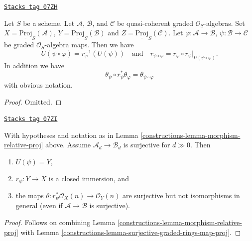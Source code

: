 \begin{lemma}
\label{constructions-lemma-morphism-relative-proj-transitive}
\href{https://stacks.math.columbia.edu/tag/07ZH}{\texttt{Stacks tag 07ZH}}

Let $S$ be a scheme. Let $\mathcal{A}$, $\mathcal{B}$, and $\mathcal{C}$ be
quasi-coherent graded $\mathcal{O}_S$-algebras.
Set $X = \underline{\text{Proj}}_S(\mathcal{A})$,
$Y = \underline{\text{Proj}}_S(\mathcal{B})$ and
$Z = \underline{\text{Proj}}_S(\mathcal{C})$.
Let $\varphi : \mathcal{A} \to \mathcal{B}$,
$\psi : \mathcal{B} \to \mathcal{C}$ be graded $\mathcal{O}_S$-algebra maps.
Then we have
$$
U(\psi \circ \varphi) = r_\varphi^{-1}(U(\psi))
\quad
\text{and}
\quad
r_{\psi \circ \varphi}
=
r_\varphi \circ r_\psi|_{U(\psi \circ \varphi)}.
$$
In addition we have
$$
\theta_\psi \circ r_\psi^*\theta_\varphi
=
\theta_{\psi \circ \varphi}
$$
with obvious notation.
\end{lemma}

\begin{proof}
Omitted.
\end{proof}

\begin{lemma}
\label{constructions-lemma-surjective-graded-rings-map-relative-proj}
\href{https://stacks.math.columbia.edu/tag/07ZI}{\texttt{Stacks tag 07ZI}}

With hypotheses and notation as in Lemma \ref{constructions-lemma-morphism-relative-proj}
above. Assume $\mathcal{A}_d \to \mathcal{B}_d$ is surjective for
$d \gg 0$. Then
\begin{enumerate}
\item $U(\psi) = Y$,
\item $r_\psi : Y \to X$ is a closed immersion, and
\item the maps $\theta : r_\psi^*\mathcal{O}_X(n) \to \mathcal{O}_Y(n)$
are surjective but not isomorphisms in general (even if
$\mathcal{A} \to \mathcal{B}$ is surjective).
\end{enumerate}
\end{lemma}

\begin{proof}

Follows on combining
Lemma \ref{constructions-lemma-morphism-relative-proj}
with
Lemma \ref{constructions-lemma-surjective-graded-rings-map-proj}.
\end{proof}


